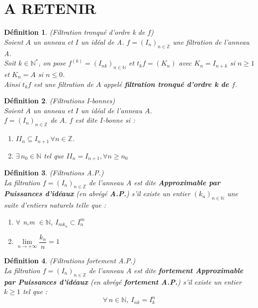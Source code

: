 \documentclass[12pt, a4paper, oneside]{article}
\newtheorem{madefinition}{Définition}
\begin{document}
	\section{A RETENIR}
	\begin{madefinition} (Filtration tronqué d'ordre k de $f$) \\
		Soient $A$ un anneau et $I$ un idéal de A. $f = (I_n)_{n\in \mathbb{Z}}$ une filtration de l'anneau A.\\
		Soit $k \in \mathbb{N}^{*}$, on pose $f^{(k)} = (I_{nk})_{n\in \mathbb{N}}$ et $t_{k}f=(K_n)$ avec $K_n = I_{n+k}$ si $n \geqslant 1 $ et $K_n = A$ si $n \leqslant 0$.\\
		Ainsi $t_{k}f$ est une filtration de $A$ appelé \textbf{filtration tronqué d'ordre k de $f$}.
	\end{madefinition}
	\begin{madefinition}(Filtrations I-bonnes)\\
		Soient $A$ un anneau et $I$ un idéal de l'anneau $A$.\\
		$f = (I_n)_{n \in \mathbb{Z}}$ de $A$. $f$ est dite $I$-bonne si :
		\begin{enumerate}
			\item[i)]$ II_n \subseteq I_{n+1} \, \forall n \in \mathbb{Z}$.
			\item[ii)]$\exists \, n_0 \in \mathbb{N}$ tel que $II_n = I_{n+1}, \forall n \geqslant n_0$
		\end{enumerate}
	\end{madefinition}
	\begin{madefinition} (Filtrations A.P.) \\
		La filtration $f = (I_n)_{n \in \mathbb{Z}}$ de l'anneau $A$ est dite \textbf{Approximable par Puissances d'idéaux} (en abrégé \textbf{A.P.}) s'il existe un entier $(k_{n})_{n \in \mathbb{N}}$ une suite d'entiers naturels telle que :
		\begin{enumerate}
			\item[(i)] $\forall$ n,m $\in \mathbb{N}$, $I_{mk_n} \subset I_n^{m}$
			\item[(ii)] $\underset{n\longrightarrow +\infty }{\lim }\dfrac{k_{n}}{n}=1$
		\end{enumerate}
	\end{madefinition}
	\begin{madefinition}(Filtrations fortement A.P.)\\
		La filtration $f = (I_n)_{n \in \mathbb{Z}}$ de l'anneau $A$ est dite \textbf{fortement Approximable par Puissances d'idéaux} (en abrégé \textbf{fortement A.P.}) s'il existe un entier $k \geqslant 1$ tel que :
		\[ \forall \, n \in \mathbb{N}, \ I_{nk} = I_k^n \]
	\end{madefinition}
\end{document}

